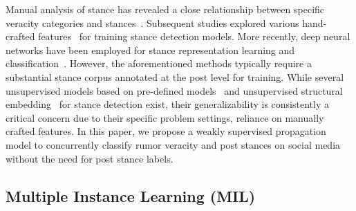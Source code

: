 Manual analysis of stance has revealed a close relationship between specific veracity categories and stances~\cite{mendoza2010twitter}. Subsequent studies explored various hand-crafted features~\cite{lukasik2016hawkes} 
for training stance detection models. More recently, deep neural networks have been employed for stance representation learning and classification~\cite{zhang2019stances,zhao2020pretrained,kochkina2017turing,wei2019modeling,liang2022jointcl}.
However, the aforementioned methods typically require a substantial stance corpus annotated at the post level for training. While several unsupervised models based on pre-defined models~\cite{kobbe2020unsupervised,allaway2020zero} and unsupervised structural embedding~\cite{DBLP:conf/aaai/RanJ23} for stance detection exist, their generalizability is consistently a critical concern due to their specific problem settings, reliance on manually crafted features.
In this paper, we propose a weakly supervised propagation model to concurrently classify rumor veracity and post stances on social media without the need for post stance labels. 

\subsection{Multiple Instance Learning (MIL)}

